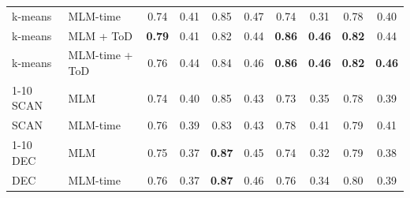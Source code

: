 \begin{table}[t]
\begin{tabular}{llcccccc|cc}
k-means & MLM-time & 0.74 & 0.41 & 0.85 & 0.47 & 0.74 & 0.31 & 0.78 & 0.40 \\
k-means & MLM + ToD & \textbf{0.79} & 0.41 & 0.82 & 0.44 & \textbf{0.86} & \textbf{0.46} & \textbf{0.82} & 0.44 \\
k-means & MLM-time + ToD & 0.76 & 0.44 & 0.84 & 0.46 & \textbf{0.86} & \textbf{0.46} & \textbf{0.82} & \textbf{0.46} \\
\cmidrule{1-10}
SCAN & MLM & 0.74 & 0.40 & 0.85 & 0.43 & 0.73 & 0.35 & 0.78 & 0.39 \\
SCAN & MLM-time & 0.76 & 0.39 & 0.83 & 0.43 & 0.78 & 0.41 & 0.79 & 0.41 \\
\cmidrule{1-10}
DEC & MLM & 0.75 & 0.37 & \textbf{0.87} & 0.45 & 0.74 & 0.32 & 0.79 & 0.38 \\
DEC & MLM-time & 0.76 & 0.37 & \textbf{0.87} & 0.46 & 0.76 & 0.34 & 0.80 & 0.39 \\
\bottomrule
\end{tabular}
\end{table}

